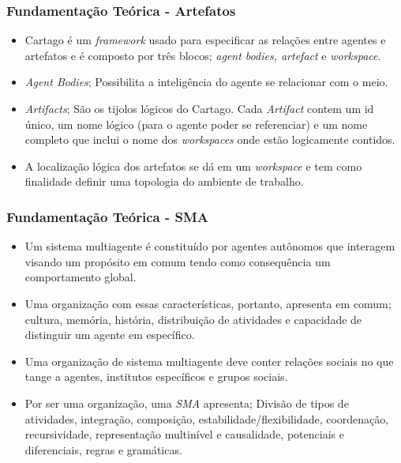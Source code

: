 \documentclass{beamer}
\begin{document}
\begin{frame}
\frametitle{Fundamentação Teórica - Artefatos}
	\begin{itemize}
		\item Cartago é um \textit{framework} usado para especificar as relações entre agentes e artefatos e é composto por três blocos; \textit{agent bodies, artefact} e \textit{workspace}. 
		\item \textit{Agent Bodies}; Possibilita a inteligência do agente se relacionar com o meio.
		\item \textit{Artifacts}; São os tijolos lógicos do Cartago. Cada \textit{Artifact} contem um id único, um nome lógico (para o agente poder se referenciar) e um nome completo que inclui o nome dos \textit{workspaces} onde estão logicamente contidos. 
		\item A localização lógica dos artefatos se dá em um \textit{workspace} e tem como finalidade definir uma topologia do ambiente de trabalho.   
	\end{itemize}
\end{frame}

\begin{frame}
\frametitle{Fundamentação Teórica - SMA}
	\begin{itemize}
		\item Um sistema multiagente é constituído por agentes autônomos que interagem visando um propósito em comum tendo como consequência um comportamento global. 
		\item Uma organização com essas características, portanto, apresenta em comum; cultura, memória, história, distribuição de atividades e capacidade de distinguir um agente em específico. 
		\item Uma organização de sistema multiagente deve conter relações sociais no que tange a agentes, institutos específicos e grupos sociais. 
		\item Por ser uma organização, uma \textit{SMA} apresenta; Divisão de tipos de atividades, integração, composição, estabilidade/flexibilidade, coordenação, recursividade, representação multinível e causalidade, potenciais e diferenciais, regras e gramáticas.
	\end{itemize}
\end{frame}
\end{document}
